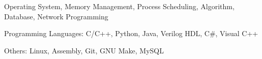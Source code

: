 

\begin{cvskills}

  \cvskill
    {Operating System, Memory Management, Process Scheduling, Algorithm, Database, Network Programming}
    {}
    
  \cvskill
    {Programming Languages:}
    {C/C++, Python, Java, Verilog HDL, C\#, Visual C++}
    
  \cvskill
    {Others:}
    {Linux, Assembly, Git, GNU Make, MySQL}
\end{cvskills}
